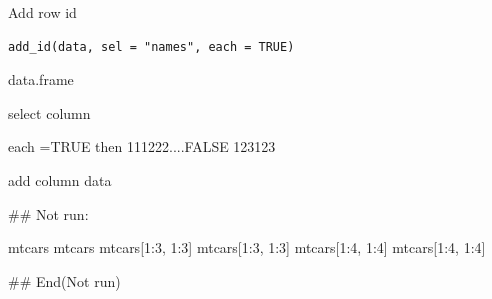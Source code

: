 \documentclass[a4paper]{book}
\begin{document}
%
\begin{Description}
Add row id
\end{Description}
%
\begin{Usage}
\begin{verbatim}
add_id(data, sel = "names", each = TRUE)
\end{verbatim}
\end{Usage}
%
\begin{Arguments}
\begin{ldescription}
\item[\code{data}] data.frame

\item[\code{sel}] select column

\item[\code{each}] each =TRUE then 111222....FALSE 123123
\end{ldescription}
\end{Arguments}
%
\begin{Value}
add column data
\end{Value}
%
\begin{Examples}
\begin{ExampleCode}

\#\# Not run: 

mtcars %
mtcars %
mtcars[1:3, 1:3] %
mtcars[1:3, 1:3] %
mtcars[1:4, 1:4] %
mtcars[1:4, 1:4] %




## End(Not run)
\end{ExampleCode}
\end{Examples}
\end{document}
